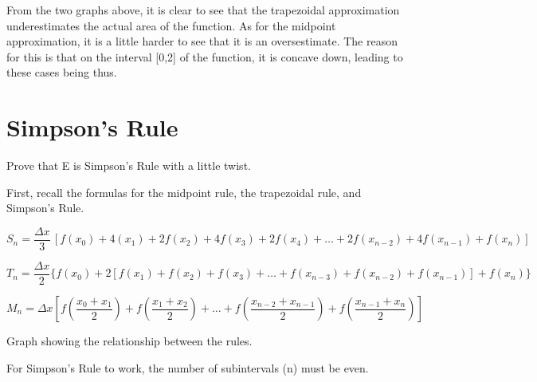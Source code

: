 \documentclass[letterpaper,12pt]{article}
\theoremstyle{definition}
\begin{document}
\vspace{1cm}

From the two graphs above, it is clear to see that the trapezoidal approximation underestimates the actual area of the function. As for the midpoint approximation, it is a little harder to see that it is an oversestimate. The reason for this is that on the interval [0,2] of the function, it is concave down, leading to these cases being thus.

\pagebreak

\section{Simpson's Rule}

\begin{large}
  Prove that E is Simpson's Rule with a little twist.
\end{large}

\vspace{1cm}

First, recall the formulas for the midpoint rule, the trapezoidal rule, and Simpson's Rule.

\vspace{1cm}

$S_n=\dfrac{\Delta x}{3}\, [f(x_0)+4(x_1)+2f(x_2)+4f(x_3)+2f(x_4)+\ldots+2f(x_{n-2})+4f(x_{n-1})+f(x_n)]$

\vspace{1cm}

$T_n=\dfrac{\Delta x}{2}\{ f(x_0)+2[f(x_1)+f(x_2)+f(x_3)+\ldots +f(x_{n-3})+f(x_{n-2})+f(x_{n-1})]+f(x_n)\}$

\vspace{1cm}

$M_n=\Delta x[f(\dfrac{x_0+x_1}{2})+f(\dfrac{x_1+x_2}{2})+\ldots +f(\dfrac{x_{n-2}+x_{n-1}}{2})+f(\dfrac{x_{n-1}+x_n}{2})]$

\vspace{1cm}

\begin{center}
\end{center}

\begin{center}
Graph showing the relationship between the rules.
\end{center}

\vspace{1cm}

\pagebreak

For Simpson's Rule to work, the number of subintervals (n) must be even.
\end{document}
